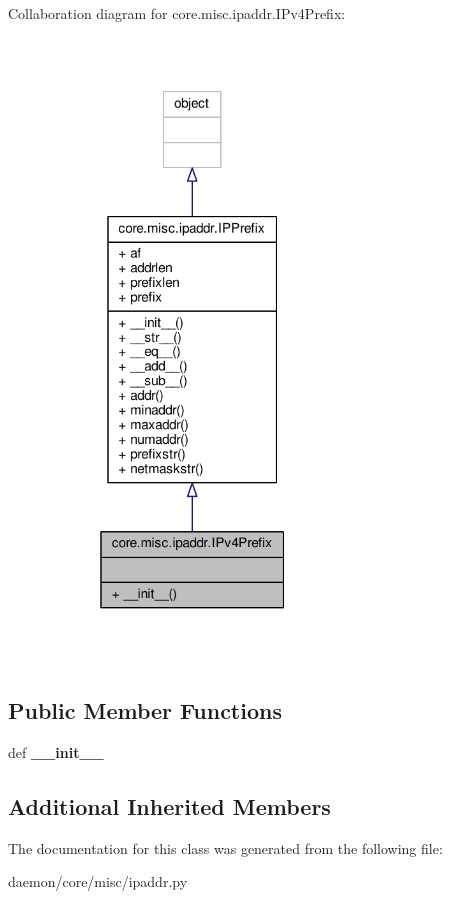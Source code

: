 Collaboration diagram for core.\+misc.\+ipaddr.\+I\+Pv4\+Prefix\+:
\nopagebreak
\begin{figure}[H]
\begin{center}
\leavevmode
\includegraphics[width=217pt]{classcore_1_1misc_1_1ipaddr_1_1_i_pv4_prefix__coll__graph}
\end{center}
\end{figure}
\subsection*{Public Member Functions}
\begin{DoxyCompactItemize}
\item 
\hypertarget{classcore_1_1misc_1_1ipaddr_1_1_i_pv4_prefix_a397cc54403a984078fdb52c76a23998d}{def {\bfseries \+\_\+\+\_\+init\+\_\+\+\_\+}}\label{classcore_1_1misc_1_1ipaddr_1_1_i_pv4_prefix_a397cc54403a984078fdb52c76a23998d}

\end{DoxyCompactItemize}
\subsection*{Additional Inherited Members}


The documentation for this class was generated from the following file\+:\begin{DoxyCompactItemize}
\item 
daemon/core/misc/ipaddr.\+py\end{DoxyCompactItemize}
